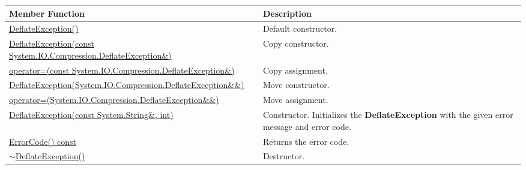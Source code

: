 \documentclass[a4paper,oneside,11.000000pt]{book}
\begin{document}
\begin{flushleft}
\begin{supertabular}[l]{!{\raggedright}p{7.575cm}!{\raggedright}p{7.575cm}}
\textbf{Member Function}
& \textbf{Description}
\\
\hline
\hyperlink{System.IO.Compression.DeflateException.constructor.P.System.IO.Compression.DeflateException}{DeflateException()}
& Default constructor.

\\
\hyperlink{System.IO.Compression.DeflateException.constructor.P.System.IO.Compression.DeflateException.C.R.System.IO.Compression.DeflateException}{DeflateException(const System.\-IO.\-Compression.\-DeflateException\&\-)}
& Copy constructor.

\\
\hyperlink{System.IO.Compression.DeflateException.operator.assign.P.System.IO.Compression.DeflateException.C.R.System.IO.Compression.DeflateException}{operator=(const System.\-IO.\-Compression.\-DeflateException\&\-)}
& Copy assignment.

\\
\hyperlink{System.IO.Compression.DeflateException.constructor.P.System.IO.Compression.DeflateException.RR.System.IO.Compression.DeflateException}{DeflateException(System.\-IO.\-Compression.\-DeflateException\&\-\&\-)}
& Move constructor.

\\
\hyperlink{System.IO.Compression.DeflateException.operator.assign.P.System.IO.Compression.DeflateException.RR.System.IO.Compression.DeflateException}{operator=(System.\-IO.\-Compression.\-DeflateException\&\-\&\-)}
& Move assignment.

\\
\hyperlink{System.IO.Compression.DeflateException.constructor.P.System.IO.Compression.DeflateException.C.R.System.String.int}{DeflateException(const System.\-String\&\-, int)}
& Constructor. Initializes the \textbf{DeflateException}
 with the given error message and error code.

\\
\hyperlink{System.IO.Compression.DeflateException.ErrorCode.C.P.System.IO.Compression.DeflateException}{ErrorCode() const}
& Returns the error code.

\\
\hyperlink{System.IO.Compression.DeflateException.destructor.P.System.IO.Compression.DeflateException}{$\sim$DeflateException()}
& Destructor.

\\
\end{supertabular}

\end{flushleft}
\clearpage
\end{document}
